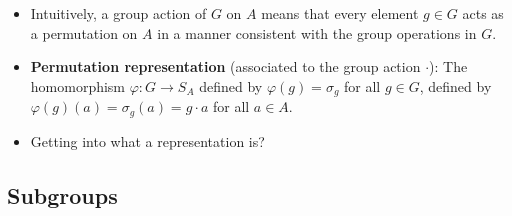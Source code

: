 \documentclass[../main.tex]{subfiles}
\begin{document}
\begin{itemize}
\begin{enumerate}
\begin{proof}
\begin{align*}
                &= g_1\cdot(g_2\cdot a)\\
                &= g_1\cdot\sigma_{g_2}(a)\\
                &= \sigma_{g_1}(\sigma_{g_2}(a))\\
                &= (\sigma_{g_1}\circ\sigma_{g_2})(a)\\
                &= (\varphi(g_1)\circ\varphi(g_2))(a)
            \end{align*}
        \end{proof}
    \end{enumerate}
    \item Intuitively, a group action of $G$ on $A$ means that every element $g\in G$ acts as a permutation on $A$ in a manner consistent with the group operations in $G$.
    \item \textbf{Permutation representation} (associated to the group action $\cdot$): The homomorphism $\varphi:G\to S_A$ defined by $\varphi(g)=\sigma_g$ for all $g\in G$, defined by $\varphi(g)(a)=\sigma_g(a)=g\cdot a$ for all $a\in A$.
    \item Getting into what a representation is?
\end{itemize}


\subsection{Subgroups}
\end{document}
